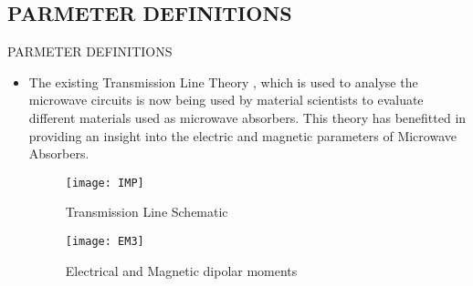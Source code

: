 \documentclass[11pt,aspect ratio=169]{beamer}
\begin{document}
\subsection{PARMETER DEFINITIONS}
\begin{frame}[t,allowframebreaks]{PARMETER DEFINITIONS}
		\small
		\begin{itemize}
			\item The existing Transmission Line Theory , which is used to analyse the microwave circuits is now being used by material scientists to evaluate different materials used as microwave absorbers. This theory has benefitted in providing an insight into the electric and magnetic parameters of Microwave Absorbers\cite{r12,r2}.
			
					\begin{figure}[H]
			
				\centering
				\tiny
				\texttt{[image: IMP]}
				\caption{Transmission Line Schematic}
				\label{fig:imp}
					\end{figure}
			\begin{figure}[H]
				\centering
				\texttt{[image: EM3]}
				\caption{Electrical and Magnetic dipolar moments\cite{r12}}
				\label{fig:em3}
			\end{figure}
			
	

\end{itemize}
\end{frame}
\end{document}
